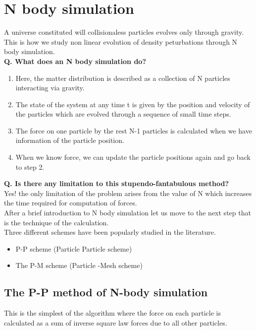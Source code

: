 \documentclass[12pt]{report}
\newcommand{\tbf}[1]{\textbf{#1}}
\begin{document}
\section{N body simulation}
A universe constituted will collisionaless particles evolves only through gravity. This is how we study non linear evolution of density peturbations through N body simulation.\\

\tbf{Q. What does an N body simulation do?}\\
\begin{enumerate}
\item Here, the matter distribution is described as a collection of N particles interacting via gravity.
\item The state of the system at any time t is given by the position and velocity of the particles which are evolved through a sequence of small time steps.
\item The force on one particle by the rest N-1 particles is calculated when we have information of the particle position.
\item When we know force, we can update the particle positions again and go back to step 2.
\end{enumerate}
\tbf{Q. Is there any limitation to this stupendo-fantabulous method?}\\

Yes! the only limitation of the problem arises from the value of N which increases the time required for computation of forces.\\

After a brief introduction to N body simulation let us move to the next step that is the technique of the calculation.\\

Three different schemes have been popularly studied in the literature.
\begin{itemize}
\item P-P scheme (Particle Particle scheme)
\item The P-M scheme (Particle -Mesh scheme)
\end{itemize}
\subsection{The P-P method of N-body simulation}
This is the simplest of the algorithm where the force on each particle is calculated as a sum of inverse square law forces due to all other particles.\\
\end{document}
